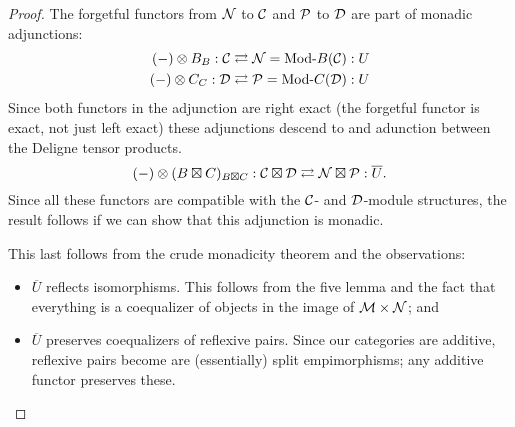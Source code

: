 \documentclass{amsart}
\begin{document}
\begin{proof}
	The forgetful functors from $\mathcal N$ to $\mathcal C$ and $\mathcal P$ to $\mathcal D$ are part of monadic adjunctions:
	\begin{align*}
		(-) \otimes B_{B}:\cC \rightleftarrows \cN = \Mod{}{B}(\cC): U \\
		(-) \otimes C_{C}:\cD \rightleftarrows \cP = \Mod{}{C}(\cD): U
	\end{align*}
	Since both functors in the adjunction are right exact (the forgetful functor is exact, not just left exact) these adjunctions descend to and adunction between the Deligne tensor products. 
	\begin{equation*}
		(-) \otimes (B \boxtimes C)_{B \boxtimes C}: \mathcal C \boxtimes \mathcal D \rightleftarrows \mathcal N \boxtimes \mathcal P: \overline{U}.
	\end{equation*}
	Since all these functors are compatible with the $\mathcal C$- and $\mathcal D$-module structures, the result follows if we can show that this adjunction is monadic.
	
	This last follows from the crude monadicity theorem  and the observations:
	\begin{itemize}
		\item $\overline{U}$ reflects isomorphisms. This follows from the five lemma and the fact that everything is a coequalizer of objects in the image of $\mathcal M \times \mathcal N$; and
		\item $\overline{U}$ preserves coequalizers of reflexive pairs. Since our categories are additive, reflexive pairs become are (essentially) split empimorphisms; any additive functor preserves these. \qedhere
	\end{itemize}
\end{proof}





\end{document}
